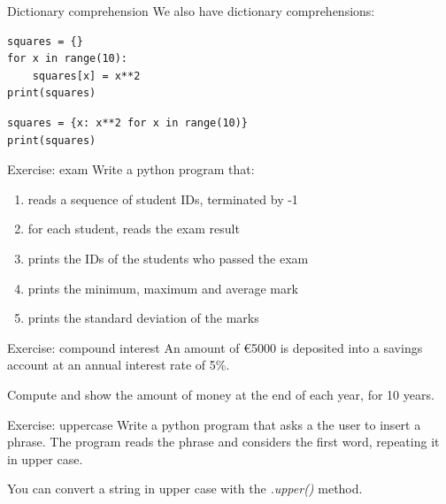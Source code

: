 \documentclass[aspectratio=169,handout]{beamer}
\begin{document}
\begin{frame}[fragile]{Dictionary comprehension}
    We also have dictionary comprehensions:

    \begin{minipage}{0.49\textwidth}
    \begin{verbatim}
squares = {}
for x in range(10):
    squares[x] = x**2
print(squares)
    \end{verbatim}
    \end{minipage}
    \begin{minipage}{0.49\textwidth}
    \begin{verbatim}
squares = {x: x**2 for x in range(10)}
print(squares)
    \end{verbatim}
    \end{minipage}
\end{frame}

\begin{frame}{Exercise: exam}
    Write a python program that:
    \begin{enumerate}
        \item reads a sequence of student IDs, terminated by -1
        \item for each student, reads the exam result
        \item prints the IDs of the students who passed the exam
        \item prints the minimum, maximum and average mark
        \item prints the standard deviation of the marks
    \end{enumerate}
\end{frame}

\begin{frame}{Exercise: compound interest}
    An amount of \euro5000 is deposited into a savings account at an annual interest rate of 5\%.

    Compute and show the amount of money at the end of each year, for 10 years.
\end{frame}

\begin{frame}{Exercise: uppercase}
    Write a python program that asks a the user to insert a phrase.
    The program reads the phrase and considers the first word, repeating it in upper case.

    You can convert a string in upper case with the \emph{.upper()} method.
\end{frame}
\end{document}
